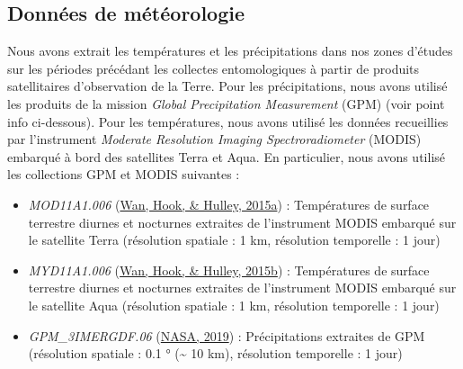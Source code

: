 \documentclass[12pt,twoside]{reedthesis}
\providecommand{\tightlist}{%
  \setlength{\itemsep}{0pt}\setlength{\parskip}{0pt}}
\begin{document}
\hypertarget{meteo-data}{%
\subsection{Données de météorologie}\label{meteo-data}}

Nous avons extrait les températures et les précipitations dans nos zones d'études sur les périodes précédant les collectes entomologiques à partir de produits satellitaires d'observation de la Terre. Pour les précipitations, nous avons utilisé les produits de la mission \emph{Global Precipitation Measurement} (GPM) (voir point info ci-dessous). Pour les températures, nous avons utilisé les données recueillies par l'instrument \emph{Moderate Resolution Imaging Spectroradiometer} (MODIS) embarqué à bord des satellites Terra et Aqua. En particulier, nous avons utilisé les collections GPM et MODIS suivantes :
\begin{itemize}
\tightlist
\item
  \emph{MOD11A1.006} (\protect\hyperlink{ref-wan__zhengming_mod11a1_2015}{Wan, Hook, \& Hulley, 2015a}) : Températures de surface terrestre diurnes et nocturnes extraites de l'instrument MODIS embarqué sur le satellite Terra (résolution spatiale : 1 km, résolution temporelle : 1 jour)
\item
  \emph{MYD11A1.006} (\protect\hyperlink{ref-wan__zhengming_myd11a1_2015}{Wan, Hook, \& Hulley, 2015b}) : Températures de surface terrestre diurnes et nocturnes extraites de l'instrument MODIS embarqué sur le satellite Aqua (résolution spatiale : 1 km, résolution temporelle : 1 jour)
\item
  \emph{GPM\_3IMERGDF.06} (\protect\hyperlink{ref-nasa_goddard_earth_sciences_data_and_information_services_center_gpm_2019}{NASA, 2019}) : Précipitations extraites de GPM (résolution spatiale : 0.1 ° (\textasciitilde{} 10 km), résolution temporelle : 1 jour)\\
\end{itemize}
\end{document}
